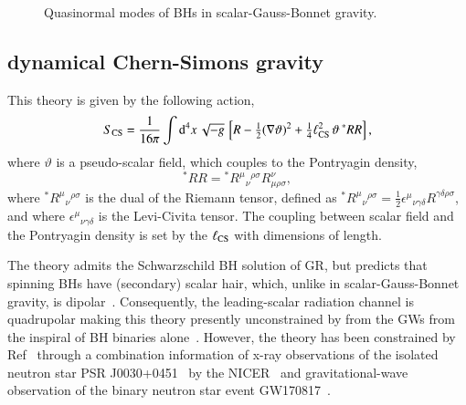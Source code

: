 \documentclass[twocolumn,prd,aps,superscriptaddress,preprintnumbers,tightenlines,showpacs,nofootinbib,eqsecnum,amsfonts,amsmath,longbibliography]{revtex4-1}
\newcommand{\dV}{{\rm d}^{4}x \, \sqrt{-g} \,}
\begin{document}
\begin{figure}
\caption{Quasinormal modes of BHs in scalar-Gauss-Bonnet gravity.}
\end{figure}

\subsection{dynamical Chern-Simons gravity}

This theory is given by the following action,
%
\begin{equation} \label{eq:action_dcs}
    S_{\rm CS} = \frac{1}{16 \pi}
    \int \dV
    \left[
    R - \tfrac{1}{2}(\nabla \vartheta)^2
    + \tfrac{1}{4} \ell^{2}_{\rm CS} \, \vartheta \, {}^{*}RR
    \right],
\end{equation}
%
where $\vartheta$ is a pseudo-scalar field, which couples
to the Pontryagin density,
%
\begin{equation}
    {}^{*}RR = {}^{*}R^{\mu}{}_{\nu}{}^{\rho\sigma} R^{\nu}_{\mu\rho\sigma},
\end{equation}
%
where ${}^{*}R^{\mu}{}_{\nu}{}^{\rho\sigma}$ is the dual of the Riemann tensor,
defined as
%
${}^{*}R^{\mu}{}_{\nu}{}^{\rho\sigma} =
\tfrac{1}{2} \epsilon^{\mu}{}_{\nu\gamma\delta}
R^{\gamma\delta\rho\sigma}$,
%
and where $\epsilon^{\mu}{}_{\nu\gamma\delta}$ is the Levi-Civita tensor.
%
The coupling between scalar field and the Pontryagin density is set by the
$\ell_{\rm CS}$ with dimensions of length.

The theory admits the Schwarzschild BH solution of GR, but predicts
that spinning BHs have (secondary) scalar hair, which, unlike in
scalar-Gauss-Bonnet gravity, is dipolar~\cite{Yunes:2009hc,Konno:2009kg}.
%
Consequently, the leading-scalar radiation channel is quadrupolar making this
theory presently unconstrained by from the GWs from the inspiral of BH
binaries alone~\cite{Nair:2019iur,Perkins:2021mhb}.
%
However, the theory has been constrained by Ref~\cite{Silva:2020acr} through a
combination information of x-ray observations of the isolated neutron star PSR
J0030+0451~\cite{Lommen:2000yt,NANOGrav:2017wvv} by the
NICER~\cite{Riley:2019yda,Miller:2019cac} and gravitational-wave observation of
the binary neutron star event GW170817~\cite{TheLIGOScientific:2017qsa}.
\end{document}
